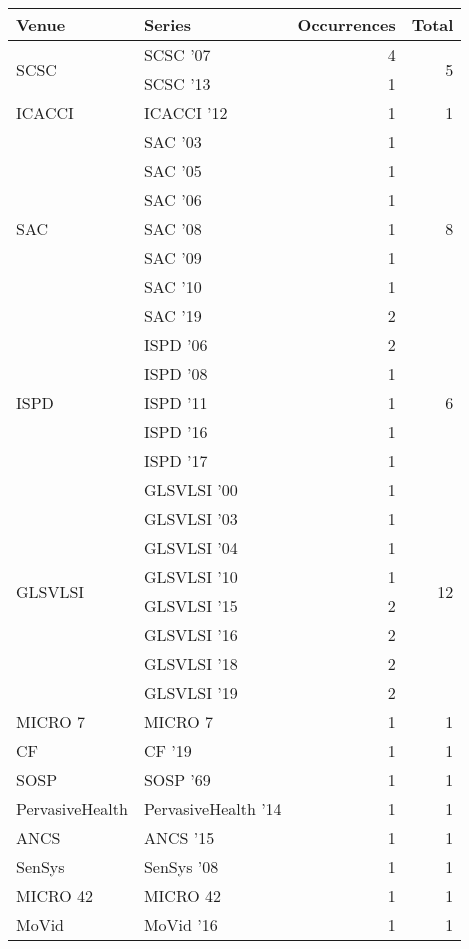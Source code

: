 \begin{table*}[t]
\begin{tabular}{llrr}
Venue & Series & Occurrences & Total\\\hline
\multirow{2}{*}{SCSC } & SCSC '07 & 4 & \multirow{2}{*}{5}\\
& SCSC '13 & 1 &\\
\multirow{1}{*}{ICACCI } & ICACCI '12 & 1 & \multirow{1}{*}{1}\\
\multirow{7}{*}{SAC } & SAC '03 & 1 & \multirow{7}{*}{8}\\
& SAC '05 & 1 &\\
& SAC '06 & 1 &\\
& SAC '08 & 1 &\\
& SAC '09 & 1 &\\
& SAC '10 & 1 &\\
& SAC '19 & 2 &\\
\multirow{5}{*}{ISPD } & ISPD '06 & 2 & \multirow{5}{*}{6}\\
& ISPD '08 & 1 &\\
& ISPD '11 & 1 &\\
& ISPD '16 & 1 &\\
& ISPD '17 & 1 &\\
\multirow{8}{*}{GLSVLSI } & GLSVLSI '00 & 1 & \multirow{8}{*}{12}\\
& GLSVLSI '03 & 1 &\\
& GLSVLSI '04 & 1 &\\
& GLSVLSI '10 & 1 &\\
& GLSVLSI '15 & 2 &\\
& GLSVLSI '16 & 2 &\\
& GLSVLSI '18 & 2 &\\
& GLSVLSI '19 & 2 &\\
\multirow{1}{*}{MICRO 7} & MICRO 7 & 1 & \multirow{1}{*}{1}\\
\multirow{1}{*}{CF } & CF '19 & 1 & \multirow{1}{*}{1}\\
\multirow{1}{*}{SOSP } & SOSP '69 & 1 & \multirow{1}{*}{1}\\
\multirow{1}{*}{PervasiveHealth } & PervasiveHealth '14 & 1 & \multirow{1}{*}{1}\\
\multirow{1}{*}{ANCS } & ANCS '15 & 1 & \multirow{1}{*}{1}\\
\multirow{1}{*}{SenSys } & SenSys '08 & 1 & \multirow{1}{*}{1}\\
\multirow{1}{*}{MICRO 42} & MICRO 42 & 1 & \multirow{1}{*}{1}\\
\multirow{1}{*}{MoVid } & MoVid '16 & 1 & \multirow{1}{*}{1}\\

\end{tabular}
\end{table*}
